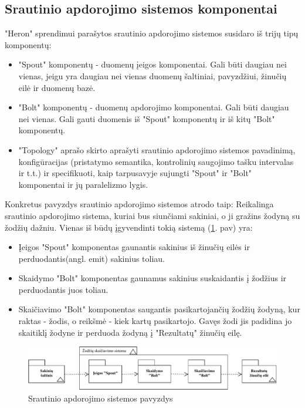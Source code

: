 \documentclass{VUMIFPSbakalaurinis}
\begin{document}
\subsection{Srautinio apdorojimo sistemos komponentai}
"Heron" sprendimui parašytos srautinio apdorojimo sistemos susidaro iš trijų tipų komponentų:
\begin{itemize}
    \item "Spout" komponentų - duomenų įeigos komponentai. Gali būti daugiau nei vienas, jeigu yra daugiau nei vienas duomenų šaltiniai, pavyzdžiui, žinučių eilė ir duomenų bazė.
    \item "Bolt" komponentų - duomenų apdorojimo komponentai. Gali būti daugiau nei vienas. Gali gauti duomenis iš "Spout" komponentų ir iš kitų "Bolt" komponentų.
    \item "Topology" aprašo skirto aprašyti srautinio apdorojimo sistemos pavadinimą, konfigūracijas (pristatymo semantika, kontrolinių saugojimo tašku intervalas ir t.t.) ir specifikuoti, kaip tarpusavyje sujungti "Spout" ir "Bolt" komponentai ir jų paralelizmo lygis. 
\end{itemize}
Konkretus pavyzdys srautinio apdorojimo sistemos atrodo taip:
Reikalinga srautinio apdorojimo sistema, kuriai bus siunčiami sakiniai, o ji gražins žodyną su žodžių dažniu. Vienas iš būdų įgyvendinti tokią sistemą (\ref{img:example}. pav) yra:
\begin{itemize}
    \item Įeigos "Spout" komponentas gaunantis sakinius iš žinučių eilės ir perduodantis(angl. emit) sakinius toliau.
    \item Skaidymo "Bolt" komponentas gaunamus sakinius suskaidantis į žodžius ir perduodantis juos toliau.
    \item Skaičiavimo "Bolt" komponentas saugantis pasikartojančių žodžių žodyną, kur raktas - žodis, o reikšmė - kiek kartų pasikartojo. Gavęs žodi jis padidina jo skaitiklį žodyne ir perduoda žodyną į "Rezultatų" žinučių eilę.
\end{itemize}
\begin{figure}[H]
    \centering
    \includegraphics[width=1\textwidth]{img/pavyzdine_sistema.pdf}
    \caption{Srautinio apdorojimo sistemos pavyzdys}
    \label{img:example}
\end{figure}
\end{document}
